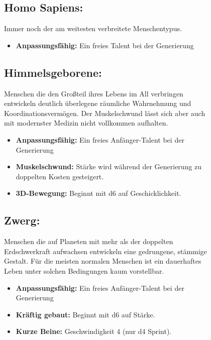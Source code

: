 \documentclass[10pt,a4paper]{report}
\begin{document}
\begin{figure}[h!]
\subsection*{Homo Sapiens:} Immer noch der am weitesten verbreitete Menschentypus.
\begin{itemize}
\item \textbf{Anpassungsfähig:} Ein freies Talent bei der Generierung
\end{itemize}
\end{figure}

\begin{figure}[h!]
\subsection*{Himmelsgeborene:} Menschen die den Großteil ihres Lebens im All verbringen entwickeln deutlich überlegene räumliche Wahrnehmung und Koordinationsvermögen. Der Muskelschwund lässt sich aber auch mit modernster Medizin nicht vollkommen aufhalten.
\begin{itemize}
\item \textbf{Anpassungsfähig:} Ein freies Anfänger-Talent bei der Generierung
\item \textbf{Muskelschwund:} Stärke wird während der Generierung zu doppelten Kosten gesteigert.
\item \textbf{3D-Bewegung:} Beginnt mit d6 auf Geschicklichkeit.
\end{itemize}
\end{figure}

\begin{figure}[h!]
\subsection*{Zwerg:} Menschen die auf Planeten mit mehr als der doppelten Erdschwerkraft aufwachsen entwickeln eine gedrungene, stämmige Gestalt. Für die meisten normalen Menschen ist ein dauerhaftes Leben unter solchen Bedingungen kaum vorstellbar.
\begin{itemize}
\item \textbf{Anpassungsfähig:} Ein freies Anfänger-Talent bei der Generierung
\item \textbf{Kräftig gebaut:} Beginnt mit d6 auf Stärke.
\item \textbf{Kurze Beine:} Geschwindigkeit 4 (nur d4 Sprint).
\end{itemize}
\end{figure}
\end{document}
